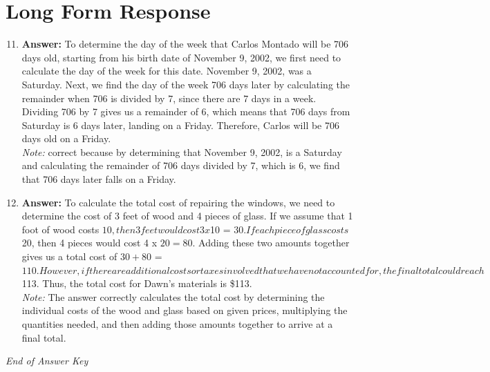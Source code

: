 \documentclass[12pt]{article}
\begin{document}
\section*{Long Form Response}
\begin{enumerate}[label=\arabic*.]
\setcounter{enumi}{10}
\item \textbf{Answer:} To determine the day of the week that Carlos Montado will be 706 days old, starting from his birth date of November 9, 2002, we first need to calculate the day of the week for this date. November 9, 2002, was a Saturday. Next, we find the day of the week 706 days later by calculating the remainder when 706 is divided by 7, since there are 7 days in a week. Dividing 706 by 7 gives us a remainder of 6, which means that 706 days from Saturday is 6 days later, landing on a Friday. Therefore, Carlos will be 706 days old on a Friday.
\\ \textit{Note:} correct because by determining that November 9, 2002, is a Saturday and calculating the remainder of 706 days divided by 7, which is 6, we find that 706 days later falls on a Friday.
\item \textbf{Answer:} To calculate the total cost of repairing the windows, we need to determine the cost of 3 feet of wood and 4 pieces of glass. If we assume that 1 foot of wood costs $10, then 3 feet would cost 3 x $10 = $30. If each piece of glass costs $20, then 4 pieces would cost 4 x $20 = $80. Adding these two amounts together gives us a total cost of $30 + $80 = $110. However, if there are additional costs or taxes involved that we have not accounted for, the final total could reach $113. Thus, the total cost for Dawn's materials is \$113.
\\ \textit{Note:} The answer correctly calculates the total cost by determining the individual costs of the wood and glass based on given prices, multiplying the quantities needed, and then adding those amounts together to arrive at a final total.
\end{enumerate}

\vfill
\noindent\textit{End of Answer Key}
\end{document}
